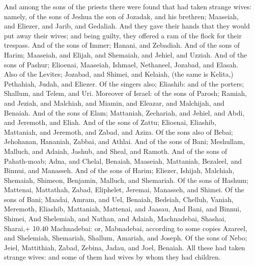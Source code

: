 And among the sons of the priests there were found that
had taken strange wives: namely, of the sons of Jeshua the son of
Jozadak, and his brethren; Maaseiah, and Eliezer, and Jarib, and
Gedaliah.  And they gave their hands that they would put
away their wives; and being guilty, they offered a ram of the flock for
their trespass.  And of the sons of Immer; Hanani, and
Zebadiah.  And of the sons of Harim; Maaseiah, and
Elijah, and Shemaiah, and Jehiel, and Uzziah.  And of the
sons of Pashur; Elioenai, Maaseiah, Ishmael, Nethaneel, Jozabad, and
Elasah.  Also of the Levites; Jozabad, and Shimei, and
Kelaiah, (the same is Kelita,) Pethahiah, Judah, and Eliezer.
 Of the singers also; Eliashib: and of the porters;
Shallum, and Telem, and Uri.  Moreover of Israel: of the
sons of Parosh; Ramiah, and Jeziah, and Malchiah, and Miamin, and
Eleazar, and Malchijah, and Benaiah.  And of the sons of
Elam; Mattaniah, Zechariah, and Jehiel, and Abdi, and Jeremoth, and
Eliah.  And of the sons of Zattu; Elioenai, Eliashib,
Mattaniah, and Jeremoth, and Zabad, and Aziza.  Of the
sons also of Bebai; Jehohanan, Hananiah, Zabbai, and Athlai.
 And of the sons of Bani; Meshullam, Malluch, and Adaiah,
Jashub, and Sheal, and Ramoth.  And of the sons of
Pahath-moab; Adna, and Chelal, Benaiah, Maaseiah, Mattaniah, Bezaleel,
and Binnui, and Manasseh.  And of the sons of Harim;
Eliezer, Ishijah, Malchiah, Shemaiah, Shimeon,  Benjamin,
Malluch, and Shemariah.  Of the sons of Hashum; Mattenai,
Mattathah, Zabad, Eliphelet, Jeremai, Manasseh, and Shimei.
 Of the sons of Bani; Maadai, Amram, and Uel,
 Benaiah, Bedeiah, Chelluh,  Vaniah,
Meremoth, Eliashib,  Mattaniah, Mattenai, and Jaasau,
 And Bani, and Binnui, Shimei,  And
Shelemiah, and Nathan, and Adaiah,  Machnadebai, Shashai,
Sharai,+ 10.40 Machnadebai: or, Mabnadebai, according to some copies
 Azareel, and Shelemiah, Shemariah, 
Shallum, Amariah, and Joseph.  Of the sons of Nebo;
Jeiel, Mattithiah, Zabad, Zebina, Jadau, and Joel, Benaiah.
 All these had taken strange wives: and some of them had
wives by whom they had children.
